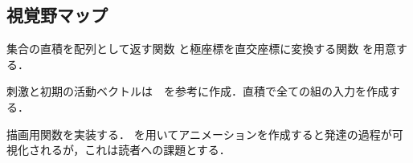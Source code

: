 \subsection{視覚野マップ}
集合の直積を配列として返す関数 と極座標を直交座標に変換する関数 を用意する．

刺激と初期の活動ベクトルは\cite{Carreira-Perpinan2005-gy}　を参考に作成．直積で全ての組の入力を作成する．



描画用関数を実装する． を用いてアニメーションを作成すると発達の過程が可視化されるが，これは読者への課題とする．



